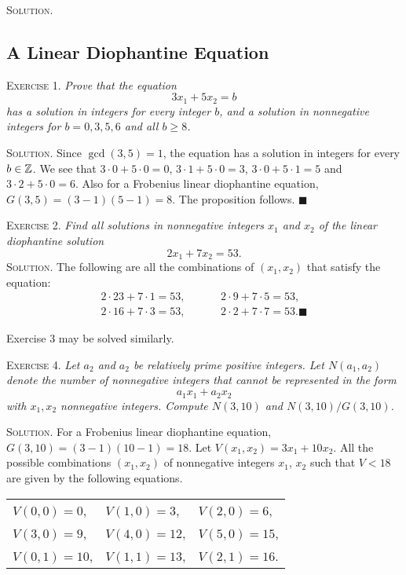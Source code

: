 \documentclass[11pt, leqno]{article}
\newcommand{\done}{\ensuremath{\blacksquare}}
\begin{document}
\textsc{Solution}.

\subsection{A Linear Diophantine Equation}

\textsc{Exercise 1}. \emph{Prove that the equation 
\begin{displaymath}
3x_1 + 5x_2 = b
\end{displaymath}
has a solution in integers for every integer $b$, and a solution in nonnegative integers for $b=0,3,5,6$ and all $b\geq 8$.}

\textsc{Solution}. Since $\gcd(3,5) = 1$, the equation has a solution in integers for every $b\in\mathbb{Z}$. We see that $3\cdot 0 + 5\cdot 0 = 0$, $3\cdot 1 + 5\cdot 0 = 3$, $3\cdot 0 + 5\cdot 1 = 5$ and $3\cdot 2 + 5\cdot 0 = 6$. Also for a Frobenius linear diophantine equation, $G(3,5) = (3-1)(5-1) = 8$. The proposition follows. \done

\textsc{Exercise 2}. \emph{Find all solutions in nonnegative integers $x_1$ and $x_2$ of the linear diophantine solution 
\begin{displaymath}
2x_1 + 7x_2 = 53.
\end{displaymath}}\textsc{Solution}. The following are all the combinations of $(x_1, x_2)$ that satisfy the equation: 
\begin{align*}
  2 \cdot 23 + 7 \cdot 1 = 53, \hspace{1cm} & 2 \cdot 9 + 7 \cdot 5 = 53,\\
  2 \cdot 16 + 7 \cdot 3 = 53, \hspace{1cm} & 2 \cdot 2 + 7 \cdot 7 = 53. \done
\end{align*}

Exercise $3$ may be solved similarly.

\textsc{Exercise 4}. \emph{Let $a_2$ and $a_2$ be relatively prime positive integers. Let $N(a_1, a_2)$ denote the number of nonnegative integers that cannot be represented in the form 
\begin{displaymath}
a_1x_1 + a_2x_2
\end{displaymath}
with $x_1, x_2$ nonnegative integers. Compute $N(3,10)$ and $N(3,10)/G(3,10)$.}

\textsc{Solution}. For a Frobenius linear diophantine equation, $G(3,10) = (3-1)(10-1) = 18$. Let $V(x_1, x_2) = 3x_1 + 10x_2$. All the possible combinations $(x_1, x_2)$ of nonnegative integers $x_1$, $x_2$ such that $V<18$ are given by the following equations.
\begin{longtable}{p{6em} p{6em} p{6em}}
  $V(0, 0) = 0$, & $V(1,0) = 3$, & $V(2,0) = 6$, \\
  $V(3, 0) = 9$, & $V(4, 0) = 12$, & $V(5, 0) = 15$, \\
  $V(0, 1) = 10$, & $V(1, 1) = 13$, & $V(2, 1) = 16$.
\end{longtable}
\reduce
\end{document}
